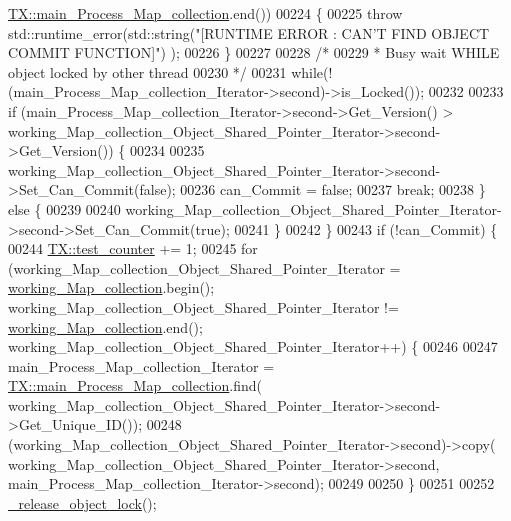\begin{DoxyCode}
      \hyperlink{class_t_x_a1a45d726894190695314464d7cd97c29_a1a45d726894190695314464d7cd97c29}{TX::main\_Process\_Map\_collection}.end())
00224             \{
00225                 \textcolor{keywordflow}{throw} std::runtime\_error(std::string(\textcolor{stringliteral}{"[RUNTIME ERROR : CAN'T FIND OBJECT COMMIT FUNCTION]"})
      );
00226             \}
00227 
00228         \textcolor{comment}{/*}
00229 \textcolor{comment}{         * Busy wait WHILE object locked by other thread}
00230 \textcolor{comment}{         */}
00231         \textcolor{keywordflow}{while}(!(main\_Process\_Map\_collection\_Iterator->second)->is\_Locked());
00232 
00233         \textcolor{keywordflow}{if} (main\_Process\_Map\_collection\_Iterator->second->Get\_Version() > 
      working\_Map\_collection\_Object\_Shared\_Pointer\_Iterator->second->Get\_Version()) \{
00234 
00235             working\_Map\_collection\_Object\_Shared\_Pointer\_Iterator->second->Set\_Can\_Commit(\textcolor{keyword}{false});
00236             can\_Commit = \textcolor{keyword}{false};
00237             \textcolor{keywordflow}{break};
00238         \} \textcolor{keywordflow}{else} \{
00239 
00240             working\_Map\_collection\_Object\_Shared\_Pointer\_Iterator->second->Set\_Can\_Commit(\textcolor{keyword}{true});
00241         \}
00242     \}
00243     \textcolor{keywordflow}{if} (!can\_Commit) \{
00244         \hyperlink{class_t_x_a25838234aab99ae891a90eb8623a8b3c_a25838234aab99ae891a90eb8623a8b3c}{TX::test\_counter} += 1;
00245         \textcolor{keywordflow}{for} (working\_Map\_collection\_Object\_Shared\_Pointer\_Iterator = 
      \hyperlink{class_t_x_a81aafda16e2f20e36ec6c68e584668ff_a81aafda16e2f20e36ec6c68e584668ff}{working\_Map\_collection}.begin(); working\_Map\_collection\_Object\_Shared\_Pointer\_Iterator
       != \hyperlink{class_t_x_a81aafda16e2f20e36ec6c68e584668ff_a81aafda16e2f20e36ec6c68e584668ff}{working\_Map\_collection}.end(); 
      working\_Map\_collection\_Object\_Shared\_Pointer\_Iterator++) \{
00246           
00247             main\_Process\_Map\_collection\_Iterator  = 
      \hyperlink{class_t_x_a1a45d726894190695314464d7cd97c29_a1a45d726894190695314464d7cd97c29}{TX::main\_Process\_Map\_collection}.find(
      working\_Map\_collection\_Object\_Shared\_Pointer\_Iterator->second->Get\_Unique\_ID());
00248             (working\_Map\_collection\_Object\_Shared\_Pointer\_Iterator->second)->copy(
      working\_Map\_collection\_Object\_Shared\_Pointer\_Iterator->second, main\_Process\_Map\_collection\_Iterator->second);
00249 
00250         \}
00251         
00252         \hyperlink{class_t_x_a4c13d2015dc15d0f788fa9a1413f0463_a4c13d2015dc15d0f788fa9a1413f0463}{\_release\_object\_lock}();

\end{DoxyCode}

